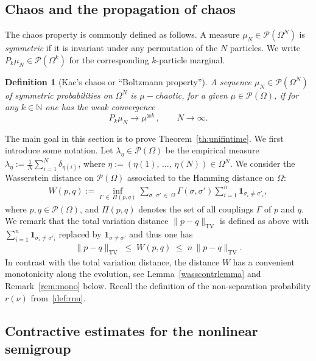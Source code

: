 \documentclass[10pt,a4paper]{article}
\newtheorem{defi}[theorem]{Definition}
\renewcommand{\leq}{\;\leqslant\;}
\newcommand{\Om}{\Omega}
\newcommand{\si}{\sigma}
\newcommand{\tv}{\mathrm{TV}}
\newcommand{\ind}{\mathbf{1}}
\newcommand{\cP}{\mathcal{P}}
\newcommand{\bbN}{\mathbb{N}}
\let\G=\Gamma
\let\O=\Omega
\begin{document}
\subsection{Chaos and the propagation of chaos}

The chaos property is commonly defined as follows. A measure $\mu_N \in \cP(\O^{N})$ is \emph{symmetric} if it is invariant under any permutation of the $N$ particles. We write $ P_k\mu_N\in\cP(\O^k)$ for the corresponding $k$-particle marginal.


\begin{defi}[Kac's chaos or ``Boltzmann property'']\label{kacschaos}
A sequence $\mu_N \in \cP(\O^{N})$ of symmetric probabilities on $\Om^{N}$ is $\mu-$chaotic, for a given $\mu \in \cP(\O)$, if for any $k \in \bbN$ one has the weak convergence
\[
P_k\mu_N\longrightarrow \mu^{\otimes k}\,,\qquad N\to\infty.
\]
\end{defi}



The main goal in this section is to prove Theorem~\ref{th:unifintime}. We first introduce some notation. Let $\lambda_{\eta}\in \cP(\O)$ be the empirical measure $\lambda_{\eta}:=\frac1N\sum_{i=1}^N\delta_{\eta(i)}$, where $\eta:=(\eta(1),\,\dots,\,\eta(N))\in\O^N$. We consider the Wasserstein distance on $\cP(\O)$ associated to the Hamming distance on $\O$:
\begin{align}\label{def:W}
W(p,q):= \inf_{\G\,\in\,\Pi(p,q)}\sum_{\si,\,\si'\,\in\,\Om}\G(\si,\si')\sum_{i=1}^n\ind_{\si_i\neq\si'_i},
\end{align}
where $p,q\in\cP(\O)$, and $\Pi(p,q)$ denotes the set of all couplings $\G$ of $p$ and $q$. We remark that the total variation distance $\|p-q\|_\tv$ is defined as above with $\sum_{i=1}^n\ind_{\si_i\neq\si'_i}$ replaced by $\ind_{\si\neq\si'}$ and thus one has
\begin{align}\label{eq:tvW}
\|p-q\|_\tv\leq W(p,q) \leq n\,\|p-q\|_\tv.
\end{align}
In contrast with the total variation distance, the distance $W$ has a convenient monotonicity along the evolution, see Lemma~\ref{wasscontrlemma} and Remark~\ref{rem:mono} below. Recall the definition of the non-separation probability $r(\nu)$ from~\eqref{def:rnu}.


\subsection{Contractive estimates for the nonlinear semigroup}
\end{document}

